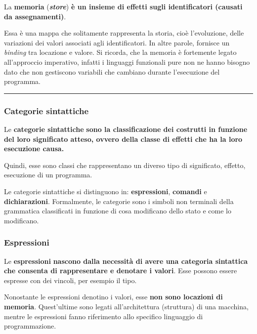 \documentclass[a4paper]{article}
\newcommand{\longline}{\noindent\rule{\textwidth}{0.4pt}}
\begin{document}
	\noindent
	\begin{boxdef}
		La \textcolor{Red3}{\textbf{memoria}} (\textbf{\emph{store}}) \textbf{è un insieme di effetti sugli identificatori (causati da assegnamenti)}.
	\end{boxdef}
	Essa è una mappa che solitamente rappresenta la storia, cioè l'evoluzione, delle variazioni dei valori associati agli identificatori. In altre parole, fornisce un \emph{binding} tra locazione e valore.\newline
	Si ricorda, che la memoria è fortemente legato all'approccio imperativo, infatti i linguaggi funzionali pure non ne hanno bisogno dato che non gestiscono variabili che cambiano durante l'esecuzione del programma.
	
	\longline
	
	\subsubsection{Categorie sintattiche}
	
	\begin{boxdef}
		Le \textcolor{Red3}{\textbf{categorie sintattiche}} \textbf{sono la classificazione dei costrutti in funzione del loro significato atteso, ovvero della classe di effetti che ha la loro esecuzione causa.}
	\end{boxdef}
	Quindi, esse sono classi che rappresentano un diverso tipo di significato, effetto, esecuzione di un programma.\newline
	
	\noindent
	Le categorie sintattiche si distinguono in: \textbf{espressioni}, \textbf{comandi} e \textbf{dichiarazioni}. Formalmente, le categorie sono i simboli non terminali della grammatica classificati in funzione di cosa modificano dello stato e come lo modificano.\newpage
	
	\subsubsection{Espressioni}
	
	Le \textcolor{Red3}{\textbf{espressioni}} \textbf{nascono dalla necessità di avere una categoria sintattica che consenta di rappresentare e denotare i valori}. Esse possono essere espresse con dei vincoli, per esempio il tipo.\newline
	
	\noindent
	Nonostante le espressioni denotino i valori, esse \textbf{non sono locazioni di memoria}. Quest'ultime sono legati all'architettura (struttura) di una macchina, mentre le espressioni fanno riferimento allo specifico linguaggio di programmazione.\newline
	
\end{document}
